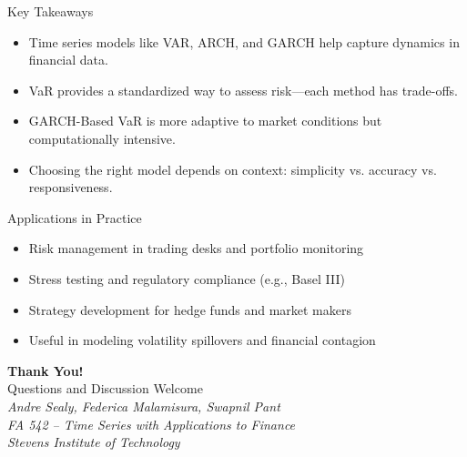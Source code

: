 \documentclass{beamer}[9pt]
\begin{document}
\begin{frame}{Key Takeaways}
	\begin{itemize}
		\item Time series models like VAR, ARCH, and GARCH help capture dynamics in financial data.
		\item VaR provides a standardized way to assess risk—each method has trade-offs.
		\item GARCH-Based VaR is more adaptive to market conditions but computationally intensive.
		\item Choosing the right model depends on context: simplicity vs. accuracy vs. responsiveness.
	\end{itemize}
\end{frame}

\begin{frame}{Applications in Practice}
	\begin{itemize}
		\item Risk management in trading desks and portfolio monitoring
		\item Stress testing and regulatory compliance (e.g., Basel III)
		\item Strategy development for hedge funds and market makers
		\item Useful in modeling volatility spillovers and financial contagion
	\end{itemize}
\end{frame}

\begin{frame}
	\centering
	\vspace{2cm}
	{\Huge \textbf{Thank You!}}\\[1em]
	{\Large Questions and Discussion Welcome}\\[2em]
	\textit{Andre Sealy, Federica Malamisura, Swapnil Pant}\\
	\textit{FA 542 – Time Series with Applications to Finance}\\
	\textit{Stevens Institute of Technology}
\end{frame}
\end{document}
